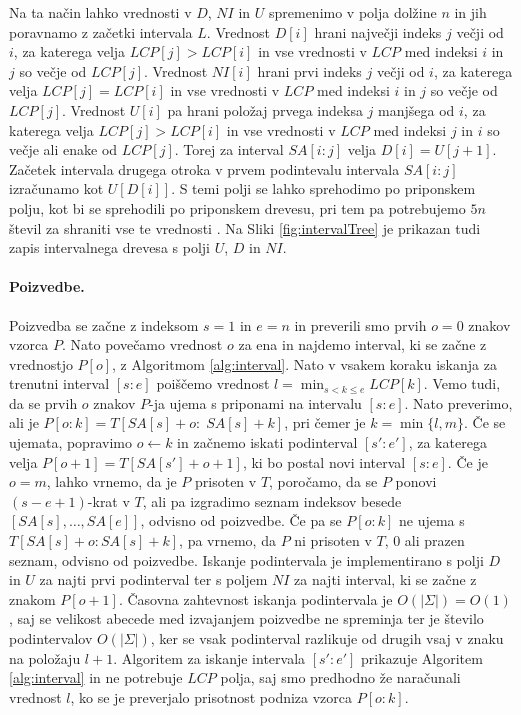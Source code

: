 Na ta način lahko vrednosti v $D$, $NI$ in $U$ spremenimo v polja dolžine $n$ in jih poravnamo z začetki intervala $L$. Vrednost $D[i]$ hrani največji indeks $j$ večji od $i$, za katerega velja $LCP[j]>LCP[i]$ in vse vrednosti v $LCP$ med indeksi $i$ in $j$ so večje od $LCP[j]$. Vrednost $NI[i]$ hrani prvi indeks $j$ večji od $i$, za katerega velja $LCP[j]=LCP[i]$ in vse vrednosti v $LCP$ med indeksi $i$ in $j$ so večje od $LCP[j]$. Vrednost $U[i]$ pa hrani položaj prvega indeksa $j$ manjšega od $i$, za katerega velja $LCP[j]>LCP[i]$ in vse vrednosti v $LCP$ med indeksi $j$ in $i$ so večje ali enake od $LCP[j]$. Torej za interval $SA[i:j]$ velja $D[i]=U[j+1]$. Začetek intervala drugega otroka v prvem podintevalu intervala $SA[i:j]$ izračunamo kot $U[D[i]]$. S temi polji se lahko sprehodimo po priponskem polju, kot bi se sprehodili po priponskem drevesu, pri tem pa potrebujemo $5n$ števil za shraniti vse te vrednosti \cite{Abouelhoda2004}. Na Sliki \ref{fig:intervalTree} je prikazan tudi zapis intervalnega drevesa s polji $U$, $D$ in $NI$. 

\paragraph{Poizvedbe.}
Poizvedba se začne z indeksom $s=1$ in $e=n$ in preverili smo prvih $o=0$ znakov vzorca $P$. Nato povečamo vrednost $o$ za ena in najdemo interval, ki se začne z vrednostjo $P[o]$, z Algoritmom \ref{alg:interval}. Nato v vsakem koraku iskanja za trenutni interval $[s:e]$ poiščemo vrednost $l=\min_{s<k\le e}LCP[k]$. Vemo tudi, da se prvih $o$ znakov $P$-ja ujema s priponami na intervalu $[s:e]$. Nato preverimo, ali je $P[o:k]=T[SA[s]+o:\; SA[s]+k]$, pri čemer je $k=\min\{l,m\}$. Če se ujemata, popravimo $o\leftarrow k$ in začnemo iskati podinterval $[s':e']$, za katerega velja $P[o+1]=T[SA[s']+o+1]$, ki bo postal novi interval $[s:e]$. Če je $o=m$, lahko vrnemo, da je $P$ prisoten v $T$, poročamo, da se $P$ ponovi $(s-e+1)$-krat v $T$, ali pa izgradimo seznam indeksov besede $[SA[s],\dots,SA[e]]$, odvisno od poizvedbe. Če pa se $P[o:k]$ ne ujema s $T[SA[s]+o:SA[s]+k]$, pa vrnemo, da $P$ ni prisoten v $T$, 0 ali prazen seznam, odvisno od poizvedbe. Iskanje podintervala je implementirano s polji $D$ in $U$ za najti prvi podinterval ter s poljem $NI$ za najti interval, ki se začne z znakom $P[o+1]$. Časovna zahtevnost iskanja podintervala je $O(|\Sigma|)=O(1)$, saj se velikost abecede med izvajanjem poizvedbe ne spreminja ter je število podintervalov $O(|\Sigma|)$, ker se vsak podinterval razlikuje od drugih vsaj v znaku na položaju $l+1$. Algoritem za iskanje intervala $[s':e']$ prikazuje Algoritem \ref{alg:interval} in ne potrebuje $LCP$ polja, saj smo predhodno že naračunali vrednost $l$, ko se je preverjalo prisotnost podniza vzorca $P[o:k]$. 

